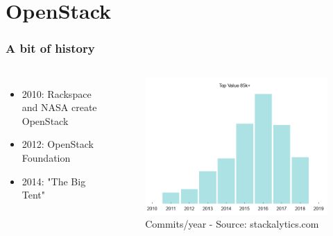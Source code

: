 \documentclass[aspectratio=169,11pt,hyperref={colorlinks=true}]{beamer}
\begin{document}
\section{OpenStack}
\begin{frame}
  \frametitle{A bit of history}
  \begin{columns}
      \begin{itemize}
          \item{2010: Rackspace and NASA create OpenStack}
          \item{2012: OpenStack Foundation}
          \item{2014: "The Big Tent"}
      \end{itemize}
      \begin{figure}
      \begin{center}
        \includegraphics[width=1\textwidth]{graphs/commits.png}
           \caption{Commits/year - Source: stackalytics.com}
      \end{center}
      \end{figure}
  \end{columns}
\end{frame}
\end{document}
